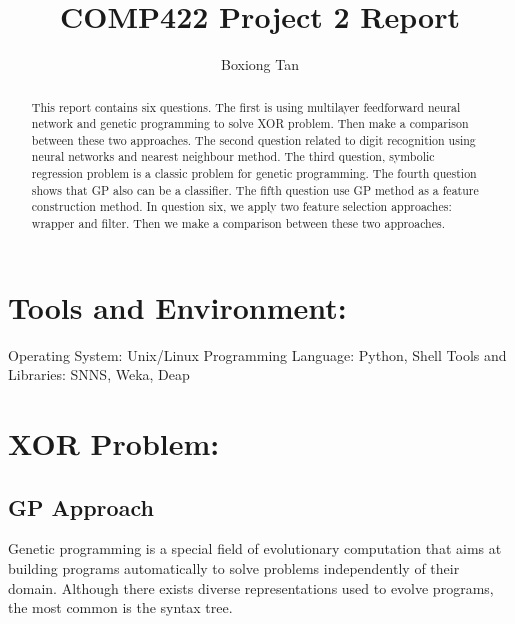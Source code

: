 \documentclass[11pt, a4paper, oneside, openright]{article}
\title{COMP422 Project 2 Report}
\author{Boxiong Tan}
\begin{document}
\frontmatter


\begin{abstract}
This report contains six questions. The first is using multilayer
feedforward neural network and genetic programming to solve XOR problem. Then make a comparison between
these two approaches. The second question related to digit recognition using neural networks and nearest neighbour method. The third question, symbolic regression problem is a classic problem for genetic programming. The fourth question shows that GP also can be a classifier. The fifth question use GP method as a feature construction method. In question six, we apply two feature selection approaches: wrapper and filter. Then we make a comparison between these two approaches.
\end{abstract}


\maketitle




\mainmatter


\section{Tools and Environment:}
Operating System: Unix/Linux
\newline Programming Language: Python, Shell
\newline Tools and Libraries: SNNS, Weka, Deap\cite{DEAP_JMLR2012}

\section{XOR Problem:}
\subsection{GP Approach}
Genetic programming is a special field of evolutionary computation that aims at building programs automatically to solve problems independently of their domain. Although there exists diverse representations used to evolve programs, the most common is the syntax tree.
\end{document}
